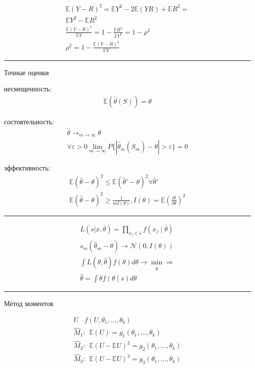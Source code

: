 \documentclass{book}
\begin{document}
\begin{gather*}
  \mathbb{E}(Y-R)^2=\mathbb{E}Y^2-2\mathbb{E}(YR)+\mathbb{E}R^2=\\
  \mathbb{E}Y^2-\mathbb{E}R^2\\
  \frac{\mathbb{E}(Y-R)^2}{\mathbb{D}Y}=1-\frac{\mathbb{E}R^2}{\mathbb{E}Y^2}=1-\rho^2\\
  \rho^2=1-\frac{\mathbb{E}(Y-R)^2}{\mathbb{D}Y}
\end{gather*}

\hrule
Точные оценки

несмещенность: 
\begin{gather*}
  \mathbb{E}(\hat{\theta}(S))=\theta
\end{gather*}

состоятельность: 
\begin{gather*}
  \hat{\theta} \rightarrow_{m\rightarrow\infty}\theta\\
  \forall \varepsilon > 0 \lim_{m\rightarrow \infty} {P\{|\hat{\theta}_m(\hat{S}_m)-\theta|>\varepsilon\}}=0
\end{gather*}

эффективность:
\begin{gather*}
  \mathbb{E}(\hat{\theta}-\theta)^2\leq \mathbb{E}(\hat{\theta}'-\theta)^2 \forall \hat{\theta}'\\
  \mathbb{E}(\hat{\theta}-\theta)^2\geq \frac{1}{mI(\theta)}, I(\theta)=\mathbb{E}\left(\frac{\partial l}{\partial \theta}\right)^2
\end{gather*}

\hrule

\begin{gather*}
  L(s|\overline{x},\overline{\theta})=\prod_{\overline{x}_j \in \overline{s}}^{} {f(x_j\mid \overline{\theta})}\\
  s_m(\hat{\theta}_m-\theta) \rightarrow \mathcal{N}(0, I(\theta))\\
  \int {L(\theta,\hat{\theta})f(\theta)d\theta} \rightarrow \min_{\hat{\theta}} \Rightarrow\\
  \hat{\theta}=\int {\theta f(\theta\mid \overline{s}) d\theta}
\end{gather*}

\hrule
Метод моментов

\begin{gather*}
  U~~~~f(U,\theta_1,\dots,\theta_k)\\
  \hat{M}_1:~~\mathbb{E}(U)=g_1(\theta_1,\dots, \theta_k)\\
  \hat{M}_2:~~\mathbb{E}(U-\mathbb{E}U)^2=g_2(\theta_1,\dots, \theta_k)\\
  \hat{M}_3:~~\mathbb{E}(U-\mathbb{E}U)^3=g_3(\theta_1,\dots, \theta_k)
\end{gather*}
\end{document}
